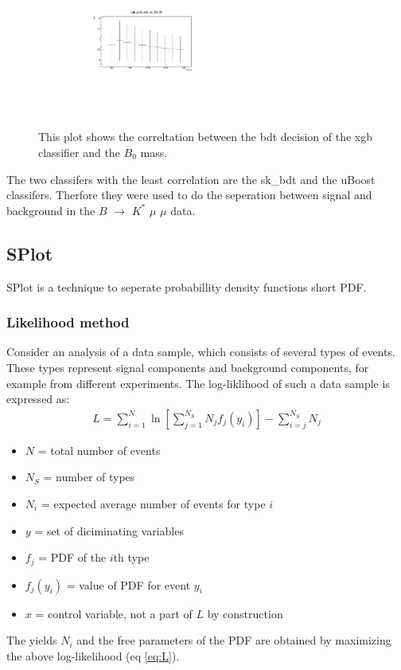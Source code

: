 \documentclass[english]{uzhpub}
\begin{document}
\begin{figure}[H]
  \centering
  \includegraphics[width=0.5\textwidth]{plots/xgb_plot_bdt_vs_B0_M}
  \caption{This plot shows the correltation between the bdt decision of the xgb classifier and the $B_0$ mass.}
  \label{fig:xgbB0M}
\end{figure}

The two classifers with the least correlation are the sk\_bdt and the uBoost classifers. Therfore they were used to do the seperation between signal and background in the $B$ $\rightarrow$ $K^{*}$ $\mu$ $\mu$ data.

\subsection{SPlot}
SPlot is a technique to seperate probabillity density functions short PDF. \\

\subsubsection{Likelihood method}
Consider an analysis of a data sample, which consists of several types of events. These types represent signal components and background components, for example from different experiments. The log-liklihood of such a data sample is expressed as:
\begin{align}
  L = \sum_{i=1}^{N} \ln \left[ \sum_{j=1}^{N_S} N_j f_j (y_i) \right] - \sum_{i=j}^{N_S} N_j \label{eq:L}
\end{align}

\begin{itemize}
  \item $N$ = total number of events \\
  \item $N_S$ = number of types \\
  \item $N_i$ = expected average number of events for type $i$ \\
  \item $y$ = set of diciminating variables \\
  \item $f_j$ = PDF of the $i$th type \\
  \item $f_j(y_i)$ = value of PDF for event $y_i$ \\
  \item $x$ = control variable, not a part of $L$ by construction
\end{itemize}
The yields $N_i$ and the free parameters of the PDF are obtained by maximizing the above log-likelihood (eq \ref{eq:L}).
\end{document}
